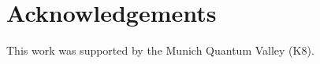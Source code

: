 \section{Acknowledgements}\label{sec:acknowledgements}

This work was supported by the Munich Quantum Valley (K8).
